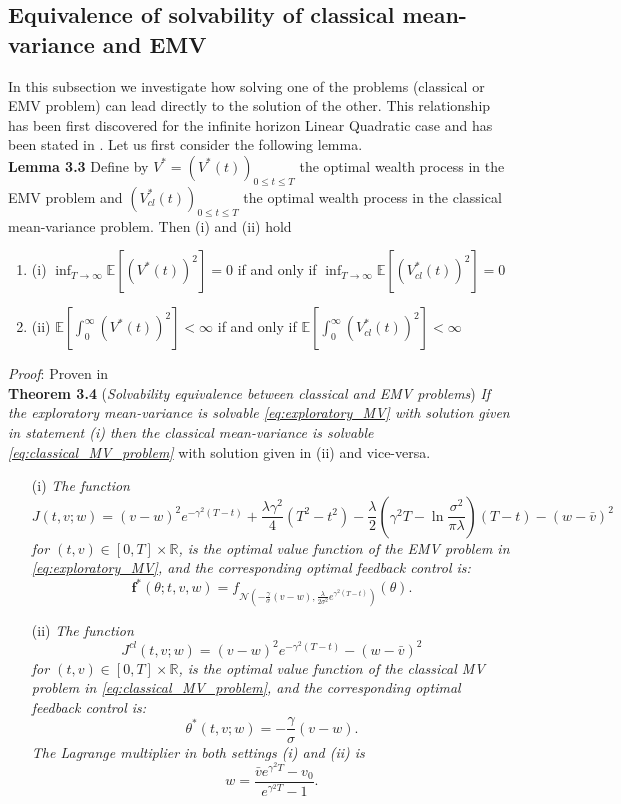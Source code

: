 \documentclass[oneside, a4paper, onecolumn, 11pt]{article}
\begin{document}
\subsection{Equivalence of solvability of classical mean-variance and EMV}  
In this subsection we investigate how solving one of the problems (classical or EMV problem) can lead directly to the solution of the other. This relationship has been first discovered for the infinite horizon Linear Quadratic case \cite{WangZariZhou2020} and has been stated in \cite{WangZhou2020}. 
Let us first consider the following lemma. 
\\\textbf{Lemma 3.3} Define by $V^*= (V^*(t))_{0\leq t\leq T}$ the optimal wealth process in the EMV problem and $(V^*_{cl}(t))_{0\leq t \leq T}$ the optimal wealth process in the classical mean-variance problem. Then (i) and (ii) hold
\begin{enumerate}
    \item (i) $\inf_{T\to\infty} \mathbb{E}\left[(V^*(t))^2\right]= 0$ if and only if  $\inf_{T\to\infty}  \mathbb{E}\left[(V^*_{cl}(t))^2\right]= 0$ 
    \item (ii) $\mathbb{E}\left[\int_{0}^{\infty}(V^*(t))^2\right] < \infty$ if and only if $\mathbb{E}\left[\int_{0}^{\infty}(V^*_{cl}(t))^2\right] < \infty$
\end{enumerate}
\textit{Proof}: Proven in \cite{WangZariZhou2020}
\\\textbf{Theorem 3.4}  (\textit{Solvability equivalence between classical and EMV problems}) \cite{WangZariZhou2020} 
\textit{If the exploratory mean-variance is solvable \eqref{eq:exploratory_MV} with solution given in statement (i) then the classical mean-variance is solvable \eqref{eq:classical_MV_problem}} with solution given in (ii) and vice-versa. 
\begin{itemize}
    \item [(i)] \textit{The function
    \[
    J(t,v;w) = (v-w)^2 e^{-\gamma^2(T-t)} + \frac{\lambda\gamma^2}{4}(T^2-t^2) -\frac{\lambda}{2}(\gamma^2T-\ln\frac{\sigma^2}{\pi\lambda})(T-t) -(w-\bar{v})^2
    \]
    for \((t,v)\in[0,T]\times\mathbb{R}\), is the optimal value function of the EMV problem in \eqref{eq:exploratory_MV}, and the corresponding optimal feedback control is:  
    \[
    \boldsymbol{f}^*(\theta;t,v,w) = f_{\mathcal{N}\left( - \frac{\gamma}{\sigma}(v-w), \frac{\lambda}{2\sigma^2} e^{\gamma^2(T-t)} \right)}(\theta).
    \]
    }
    \item [(ii)]\textit{ The function  
    \[
    J^{cl}(t,v;w) = (v-w)^2 e^{-\gamma^2(T-t)} -(w -\bar{v})^2
    \]
    for \((t,v)\in[0,T]\times\mathbb{R}\), is the optimal value function of the classical MV problem in \eqref{eq:classical_MV_problem}, and the corresponding optimal feedback control is:  
    \[
    \theta^*(t,v;w) = -\frac{\gamma}{\sigma}(v-w).
    \] 
    The Lagrange multiplier in both settings (i) and (ii) is  
    \[
    w= \frac{\bar{v}e^{\gamma^2T} - v_0}{ e^{\gamma^2T} -1 }.
    \]}
\end{itemize}
\end{document}
